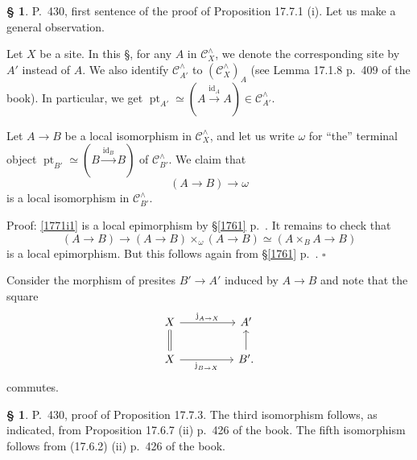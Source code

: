 \documentclass[12pt]{article}
\theoremstyle{remark}
\theoremstyle{definition}
\newtheorem{s}[thm]{\S}
\newcommand{\oo}{\operatorname}
\newcommand{\C}{\mathcal C}
\newcommand{\xr}{\xrightarrow}
\DeclareMathOperator{\id}{id}
\begin{document}
\begin{s} 
P.~430, first sentence of the proof of Proposition 17.7.1 (i). Let us make a general observation. 

Let $X$ be a site. In this \S, for any $A$ in $\C_X^\wedge$, we denote the corresponding site by $A'$ instead of $A$. We also identify $\C_{A'}^\wedge$ to $(\C_X^\wedge)_A$ (see Lemma 17.1.8 p.~409 of the book). In particular, we get $\oo{pt}_{A'}\simeq(A\xr{\id_A}A)\in\C_{A'}^\wedge$. 

Let $A\to B$ be a local isomorphism in $\C_X^\wedge$, and let us write $\omega$ for ``the'' terminal object $\oo{pt}_{B'}\simeq(B\xr{\id_B}B)$ of $\C_{B'}^\wedge$. We claim that 
\begin{equation}\label{1771i1}
(A\to B)\to\omega 
\end{equation} 
is a local isomorphism in $\C_{B'}^\wedge$.

Proof: \eqref{1771i1} is a local epimorphism by \S\ref{1761} p.~\pageref{1761}. It remains to check that 
\begin{equation}\label{1771i2}
(A\to B)\to(A\to B)\times_\omega(A\to B)\simeq(A\times_BA\to B)
\end{equation} 
is a local epimorphism. But this follows again from \S\ref{1761} p.~\pageref{1761}. $\square$ 

Consider the morphism of presites $B'\to A'$ induced by $A\to B$ and note that the square
$$
\begin{tikzcd} 
X\ar{rr}{\oo j_{A\to X}}\ar[equal]{d}&&A'\\ 
X\ar{rr}[swap]{\oo j_{B\to X}}&&B'.\ar{u}
\end{tikzcd}
$$ 
commutes.
\end{s} 

%

\begin{s} 
P.~430, proof of Proposition 17.7.3. The third isomorphism follows, as indicated, from Proposition 17.6.7 (ii) p.~426 of the book. The fifth isomorphism follows from (17.6.2) (ii) p.~426 of the book. 
\end{s} 

%
\end{document}
